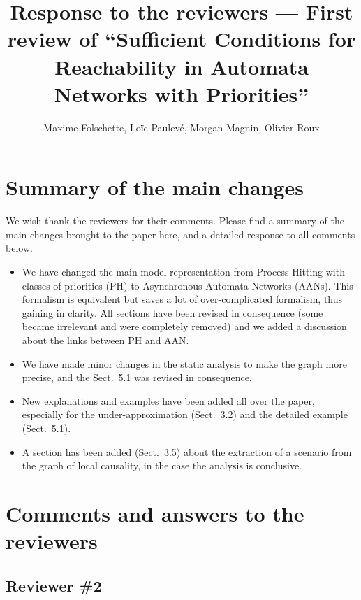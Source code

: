 \documentclass[11pt]{article}
\title{Response to the reviewers --- First review of “Sufficient Conditions for Reachability in Automata Networks with Priorities”}
\author{Maxime Folschette, Loïc Paulevé, Morgan Magnin, Olivier Roux}
\date{}
\newcommand{\todo}[1]{\textcolor{red}{\textbf{[TODO: #1]}}}
\newcommand{\answertodo}[1]{\textcolor{red}{\textbf{À appliquer :}} \textcolor{magenta}{#1}}
\newcommand{\answer}[1]{\textcolor{blue}{#1}\vspace*{1em}}
\begin{document}
\maketitle




\section*{Summary of the main changes}

We wish thank the reviewers for their comments.
Please find a summary of the main changes brought to the paper here, and a detailed response to all comments below.

\begin{itemize}
  \item We have changed the main model representation from Process Hitting
    with classes of priorities (PH) to Asynchronous Automata Networks (AANs).
    This formalism is equivalent but saves a lot of over-complicated formalism,
    thus gaining in clarity.
    All sections have been revised in consequence
    (some became irrelevant and were completely removed)
    and we added a discussion about the links between PH and AAN.
  \item We have made minor changes in the static analysis to make the graph more precise,
    and the Sect.~5.1 was revised in consequence.
  \item New explanations and examples have been added all over the paper,
    especially for the under-approximation (Sect.~3.2)
    and the detailed example (Sect.~5.1).
  \item A section has been added (Sect.~3.5) about the extraction of a scenario
    from the graph of local causality, in the case the analysis is conclusive.
\end{itemize}



\section*{Comments and answers to the reviewers}

\subsection*{Reviewer \#2}
\end{document}
